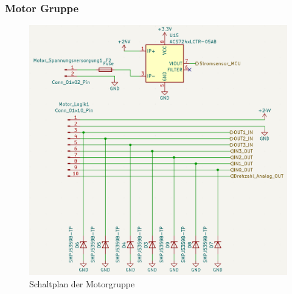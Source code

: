 \subsubsection{Motor Gruppe}
\begin{figure}[H]
	\centering
	\includegraphics[width=1.0\textwidth]{images/Hardware/Motor_Schaltplan.PNG}
	\caption{Schaltplan der Motorgruppe}
	\label{fig:Motor_gruppe}
\end{figure}


